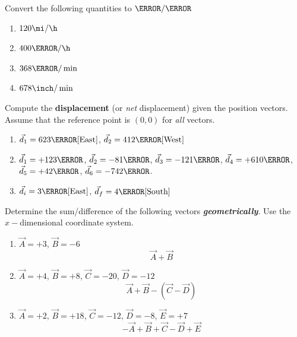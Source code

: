 \documentclass[12pt]{article} %
\newcommand{\tx}[1]{\text{#1}}
\begin{document}
\begin{qstn}[2] %
	Convert the following quantities to $\m / \s$
	\begin{enumerate}[label = (\alph*)]
		\item $120 \mi / \h$
		\vspace*{4cm}

		\item $400 \km / \h$
		\vspace*{4cm}
		
		\item $368 \m / \min$
		\vspace*{4cm}

		\item $678 \inch / \min$
		\vspace*{4cm}

	\end{enumerate}

\end{qstn}


\begin{qstn}[3]
	Compute the \textbf{displacement} (or \emph{net} displacement) given the position vectors. Assume that the reference point is $(0,0)$ for \emph{all} vectors.
    \begin{enumerate}[label=(\alph*)]
        \item $\vec d_1 = 623 \tx{\m}[\tx{East}]$, $\vec d_2 = 412 \tx{\m}[\tx{West}]$
         \vspace*{4cm}
        \item $\vec d_1 = +123\km$, $\vec d_2 = -81\km$, $\vec d_3 = -121\km$, $\vec d_4 = +610\km$, $\vec d_5 = +42\km$, $\vec d_6 = -742\m$.
        \vspace*{4cm}
        \item $\vec d_i = 3\tx{\m}[\tx{East}]$, $\vec d_f = 4\tx{\m}[\tx{South}]$
		\vspace*{5cm}
    \end{enumerate}

\end{qstn}


\begin{qstn}[4]
	Determine the sum/difference of the following vectors \textbf{\emph{geometrically}}. Use the $x-$dimensional coordinate system.
	\begin{enumerate}[label=(\alph*)]
		\item $\vec A = +3$, $\vec B = -6$ $$\vec A + \vec B$$
		\vspace*{7cm}
		\item $\vec A = +4$, $\vec B = +8$, $\vec C = -20$, $\vec D = -12$   $$\vec A + \vec B - (\vec C - \vec D)$$
		\newpage
		\item $\vec A = +2$, $\vec B = +18$, $\vec C = -12$, $\vec D = -8$, $\vec E = +7$  $$-\vec A  + \vec B + \vec C - \vec D + \vec E$$
		\vspace*{7cm}
	\end{enumerate}

\end{qstn}
\end{document}

